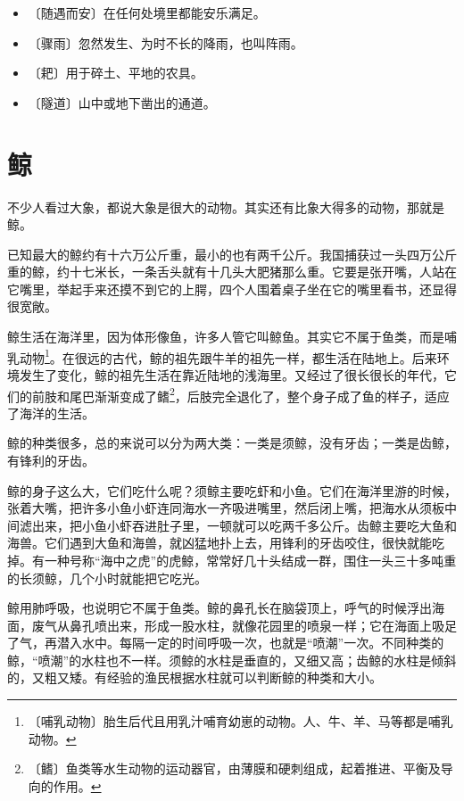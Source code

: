 \documentclass[12pt,UTF-8,openany]{ctexbook}
\begin{document}
\vspace{-1em}

\begin{itemize}
    \setlength\itemsep{-0.2em}
    \item 〔随遇而安〕在任何处境里都能安乐满足。
    \item 〔骤雨〕忽然发生、为时不长的降雨，也叫阵雨。
    \item 〔耙〕用于碎土、平地的农具。
    \item 〔隧道〕山中或地下凿出的通道。
\end{itemize}

\chapter{鲸}

\begin{Large}
    
    不少人看过大象，都说大象是很大的动物。其实还有比象大得多的动物，那就是鲸。
    
    已知最大的鲸约有十六万公斤重，最小的也有两千公斤。我国捕获过一头四万公斤重的鲸，约十七米长，一条舌头就有十几头大肥猪那么重。它要是张开嘴，人站在它嘴里，举起手来还摸不到它的上腭，四个人围着桌子坐在它的嘴里看书，还显得很宽敞。
    
    鲸生活在海洋里，因为体形像鱼，许多人管它叫鲸鱼。其实它不属于鱼类，而是哺乳动物\footnote{〔哺乳动物〕胎生后代且用乳汁哺育幼崽的动物。人、牛、羊、马等都是哺乳动物。}。在很远的古代，鲸的祖先跟牛羊的祖先一样，都生活在陆地上。后来环境发生了变化，鲸的祖先生活在靠近陆地的浅海里。又经过了很长很长的年代，它们的前肢和尾巴渐渐变成了鳍\footnote{〔鳍〕鱼类等水生动物的运动器官，由薄膜和硬刺组成，起着推进、平衡及导向的作用。}，后肢完全退化了，整个身子成了鱼的样子，适应了海洋的生活。
    
    鲸的种类很多，总的来说可以分为两大类：一类是须鲸，没有牙齿；一类是齿鲸，有锋利的牙齿。
    
    鲸的身子这么大，它们吃什么呢？须鲸主要吃虾和小鱼。它们在海洋里游的时候，张着大嘴，把许多小鱼小虾连同海水一齐吸进嘴里，然后闭上嘴，把海水从须板中间滤出来，把小鱼小虾吞进肚子里，一顿就可以吃两千多公斤。齿鲸主要吃大鱼和海兽。它们遇到大鱼和海兽，就凶猛地扑上去，用锋利的牙齿咬住，很快就能吃掉。有一种号称“海中之虎”的虎鲸，常常好几十头结成一群，围住一头三十多吨重的长须鲸，几个小时就能把它吃光。
    
    鲸用肺呼吸，也说明它不属于鱼类。鲸的鼻孔长在脑袋顶上，呼气的时候浮出海面，废气从鼻孔喷出来，形成一股水柱，就像花园里的喷泉一样；它在海面上吸足了气，再潜入水中。每隔一定的时间呼吸一次，也就是“喷潮”一次。不同种类的鲸，“喷潮”的水柱也不一样。须鲸的水柱是垂直的，又细又高；齿鲸的水柱是倾斜的，又粗又矮。有经验的渔民根据水柱就可以判断鲸的种类和大小。
    

\end{Large}
\end{document}

